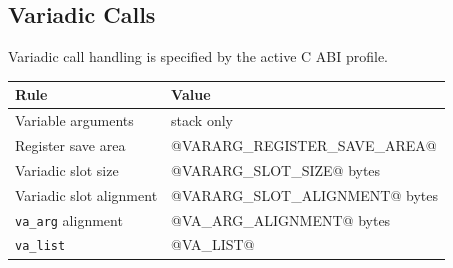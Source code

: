 \subsection{Variadic Calls}
Variadic call handling is specified by the active C ABI profile.

\begingroup\footnotesize
\setlength{\tabcolsep}{2pt}
\begin{longtable}{@{}p{2.0in}p{3.5in}@{}}
\toprule
\textbf{Rule} & \textbf{Value}\\
\midrule
\endhead
Variable arguments & stack only\\
Register save area & @VARARG_REGISTER_SAVE_AREA@\\
Variadic slot size & @VARARG_SLOT_SIZE@ bytes\\
Variadic slot alignment & @VARARG_SLOT_ALIGNMENT@ bytes\\
\texttt{va\_arg} alignment & @VA_ARG_ALIGNMENT@ bytes\\
\texttt{va\_list} & @VA_LIST@\\
\bottomrule
\end{longtable}
\endgroup
